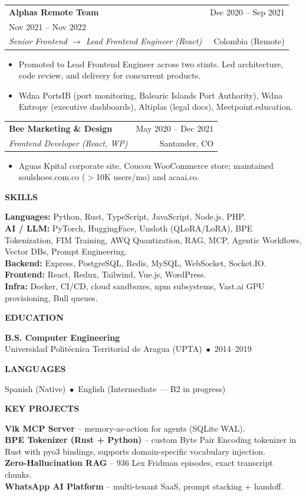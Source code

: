 \documentclass[12pt,letterpaper]{article}
\makeatletter
\newcommand{\jobentry}[4]{%
  \par\vspace{5pt}%
  \noindent
  \begin{tabularx}{\textwidth}{@{}X r@{}}
    \textbf{\color{textcolor}#1} & \scriptsize\color{muted}#2 \\[1pt]
    \small\itshape\color{accent}#3 & \scriptsize\color{muted}#4 \\
  \end{tabularx}
  \vspace{0pt}
}
\newenvironment{jobbullets}{%
  \begin{itemize}[leftmargin=10pt,itemsep=0pt,parsep=0pt,topsep=0pt,label=\textcolor{accent}{\tiny$\blacksquare$}]
  \footnotesize\color{textcolor}
}{%
  \end{itemize}
}
\newcommand{\sideblock}[2]{%
  \par\vspace{3pt}%
  \textbf{\color{accent}\small #1}\par
  {\footnotesize\color{textcolor}#2}\par
  \vspace{2pt}
}
\makeatother
\begin{document}
\begin{minipage}[t]{0.70\textwidth}
\jobentry{Alphas Remote Team}{Dec 2020 -- Sep 2021 \\ Nov 2021 -- Nov 2022}{Senior Frontend $\rightarrow$ Lead Frontend Engineer (React)}{Colombia (Remote)}
\begin{jobbullets}
\item Promoted to Lead Frontend Engineer across two stints. Led architecture, code review, and delivery for concurrent products.
\item Wdna PortsIB (port monitoring, Balearic Islands Port Authority), Wdna Entropy (executive dashboards), Altiplas (legal docs), Meetpoint.education.
\end{jobbullets}

\jobentry{Bee Marketing \& Design}{May 2020 -- Dec 2021}{Frontend Developer (React, WP)}{Santander, CO}
\begin{jobbullets}
\item Aguas Kpital corporate site, Coucou WooCommerce store; maintained soulshoes.com.co ($>$10K users/mo) and acaai.co.
\end{jobbullets}
\end{minipage}%
\hfill
\begin{minipage}[t]{0.27\textwidth}

\sideblock{SKILLS}{\textbf{Languages:} Python, Rust, TypeScript, JavaScript, Node.js, PHP.\\
\textbf{AI / LLM:} PyTorch, HuggingFace, Unsloth (QLoRA/LoRA), BPE Tokenization, FIM Training, AWQ Quantization, RAG, MCP, Agentic Workflows, Vector DBs, Prompt Engineering.\\
\textbf{Backend:} Express, PostgreSQL, Redis, MySQL, WebSocket, Socket.IO.\\
\textbf{Frontend:} React, Redux, Tailwind, Vue.js, WordPress.\\
\textbf{Infra:} Docker, CI/CD, cloud sandboxes, npm subsystems, Vast.ai GPU provisioning, Bull queues.}
\sideblock{EDUCATION}{\textbf{B.S. Computer Engineering}\\
Universidad Polit\'ecnica Territorial de Aragua (UPTA) \,$\bullet$\, 2014--2019}

\sideblock{LANGUAGES}{Spanish (Native) \,$\bullet$\, English (Intermediate --- B2 in progress)}

\sideblock{KEY PROJECTS}{\textbf{Vlk MCP Server} -- memory-as-action for agents (SQLite WAL).\\
\textbf{BPE Tokenizer (Rust + Python)} -- custom Byte Pair Encoding tokenizer in Rust with pyo3 bindings, supports domain-specific vocabulary injection.\\
\textbf{Zero-Hallucination RAG} -- 936 Lex Fridman episodes, exact transcript chunks.\\
\textbf{WhatsApp AI Platform} -- multi-tenant SaaS, prompt stacking + handoff.}
\end{minipage}
\end{document}
